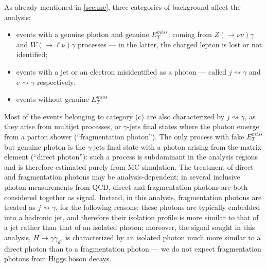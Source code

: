 
As already mentioned in \ref{sec:mc}, three categories of background affect the analysis:
\begin{itemize}
\item [(a)] events with a genuine photon and genuine $E_T^{miss}$: coming from $Z(\to\nu\nu)\gamma$ and $W(\to\ell\nu)\gamma$ processes --- in the latter, the charged lepton is lost or not identified;
\item [(b)] events with a jet or an electron misidentified as a photon --- called $j\rightsquigarrow\gamma$ and $e\rightsquigarrow\gamma$ respectively;
\item [(c)] events without genuine $E_T^{miss}$
\end{itemize}

Most of the events belonging to category (c) are also characterized by $j\rightsquigarrow\gamma$, as they arise from multijet processes, or $\gamma$-jets final states where the photon emerge from a parton shower (``fragmentation photon''). The only process with fake $E_T^{miss}$ but genuine photon is the $\gamma$-jets final state with a photon arising from the matrix element (``direct photon''): such a process is subdominant in the analysis regions and is therefore estimated purely from MC simulation. The treatment of direct and fragmentation photons may be analysis-dependent: in several inclusive photon measurements from QCD, direct and fragmentation photons are both considered together as signal. Instead, in this analysis, fragmentation photons are treated as $j\rightsquigarrow\gamma$, for the following reasons: these photons are typically embedded into a hadronic jet, and therefore their isolation profile is more similar to that of a jet rather than that of an isolated photon; moreover, the signal sought in this analysis, $H\to\gamma\gamma_d$, is characterized by an isolated photon much more similar to a direct photon than to a fragmentation photon --- we do not expect fragmentation photons from Higgs boson decays.

